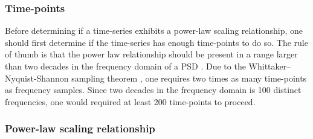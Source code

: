 \documentclass[
  sn-vancouver,
  Numbered,
  referee,
  lineno]{sn-jnl}
\begin{document}
\subsubsection{Time-points}\label{time-points-2}

Before determining if a time-series exhibits a power-law scaling
relationship, one should first determine if the time-series has enough
time-points to do so. The rule of thumb is that the power law
relationship should be present in a range larger than two decades in the
frequency domain of a PSD \citep{ekePhysiologicalTimeSeries2000}. Due to
the Whittaker--Nyquist-Shannon sampling theorem
\citep{shannonCommunicationPresenceNoise1949}, one requires two times as
many time-points as frequency samples. Since two decades in the
frequency domain is 100 distinct frequencies, one would required at
least 200 time-points to proceed.

\subsubsection{Power-law scaling
relationship}\label{power-law-scaling-relationship-3}
\end{document}

